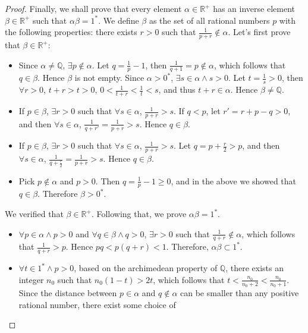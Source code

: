 \documentclass[onecolumn]{article}
\begin{document}
\begin{proof}
  Finally, we shall prove that every element $\alpha \in \mathbb{R^+}$ has an 
  inverse element $\beta \in \mathbb{R^+}$ such that $\alpha \beta = 1^*$. We 
  define $\beta$ as the set of all rational numbers $p$ with the following 
  properties: there exists $r > 0$ such that $\frac{1}{p + r} \notin \alpha$. 
  Let's first prove that $\beta \in \mathbb{R^+}$:
  \begin{itemize}
    \item Since $\alpha \neq \mathbb{Q}$, $\exists p \notin \alpha$. Let 
    $q = \frac{1}{p} - 1$, then $\frac{1}{q + 1} = p \notin \alpha$, which 
    follows that $q \in \beta$. Hence $\beta$ is not empty. Since $\alpha > 0^*$, 
    $\exists s \in \alpha \wedge s > 0$. Let $t = \frac{1}{s} > 0$, then 
    $\forall r > 0$, $t + r > t > 0$, $0 < \frac{1}{t + r} < \frac{1}{t} < s$, 
    and thus $t + r \in \alpha$. Hence $\beta \neq \mathbb{Q}$.
    \item If $p \in \beta$, $\exists r > 0$ such that $\forall s \in \alpha$, 
    $\frac{1}{p + r} > s$. If $q < p$, let $r' = r + p - q > 0$, and then 
    $\forall s \in \alpha$, $\frac{1}{q + r'} = \frac{1}{p + r} > s$. Hence 
    $q \in \beta$.
    \item If $p \in \beta$, $\exists r > 0$ such that $\forall s \in \alpha$, 
    $\frac{1}{p + r} > s$. Let $q = p + \frac{r}{2} > p$, and then 
    $\forall s \in \alpha$, $\frac{1}{q + \frac{r}{2}} = \frac{1}{p + r} > s$. 
    Hence $q \in \beta$.
    \item Pick $p \notin \alpha$ and $p > 0$. Then $q = \frac{1}{p} - 1 \geq 0$, 
    and in the above we showed that $q \in \beta$. Therefore $\beta > 0^*$.
  \end{itemize}
  We verified that $\beta \in \mathbb{R^+}$. Following that, we prove 
  $\alpha \beta = 1^*$.
  \begin{itemize}
    \item $\forall p \in \alpha \wedge p > 0$ and 
    $\forall q \in \beta \wedge q > 0$, $\exists r > 0$ such that 
    $\frac{1}{q + r} \notin \alpha$, which follows that $\frac{1}{q + r} > p$. 
    Hence $pq < p (q + r) < 1$. Therefore, $\alpha \beta \subset 1^*$.
    \item $\forall t \in 1^* \wedge p > 0$, based on the archimedean property of 
    $\mathbb{Q}$, there exists an integer $n_0$ such that $n_0(1 - t) > 2t$, 
    which follows that $t < \frac{n_0}{n_0+2} < \frac{n_0}{n_0+1}$. Since the 
    distance between $p \in \alpha$ and $q \notin \alpha$ can be smaller than 
    any positive rational number, there exist some choice of 

\end{itemize}
\end{proof}
\end{document}

